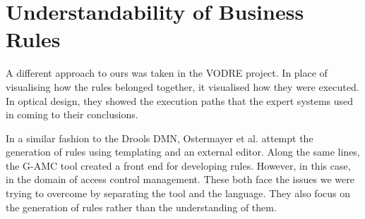 \section{Understandability of Business Rules}  

A different approach to ours was taken in the VODRE project\cite{lapaev2014vodre}.
In place of visualising how the rules belonged together, it visualised how they were executed.
In optical design, they showed the execution paths that the expert systems used in coming to their conclusions.

In a similar fashion to the Drools DMN, Ostermayer et al.\cite{ostermayer2013simplifying} attempt the generation of rules using templating and an external editor.
Along the same lines, the G-AMC tool\cite{sa2016g} created a front end for developing rules.
However, in this case, in the domain of access control management.
These both face the issues we were trying to overcome by separating the tool and the language. 
They also focus on the generation of rules rather than the understanding of them.
